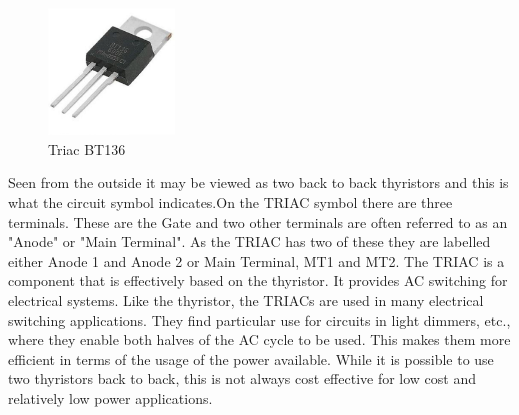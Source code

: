 \begin{figure}
	\includegraphics[width=0.3\textwidth]{photos/theory/bt136.jpg}
	\caption{Triac BT136}
\end{figure}
Seen from the outside it may be viewed as two back to back thyristors and this is what the circuit symbol indicates.On the TRIAC symbol there are three terminals. These are the Gate and two other terminals are often referred to as an "Anode" or "Main Terminal". As the TRIAC has two of these they are labelled either Anode 1 and Anode 2 or Main Terminal, MT1 and MT2.
The TRIAC is a component that is effectively based on the thyristor. It provides AC switching for electrical systems. Like the thyristor, the TRIACs are used in many electrical switching applications. They find particular use for circuits in light dimmers, etc., where they enable both halves of the AC cycle to be used. This makes them more efficient in terms of the usage of the power available. While it is possible to use two thyristors back to back, this is not always cost effective for low cost and relatively low power applications.

